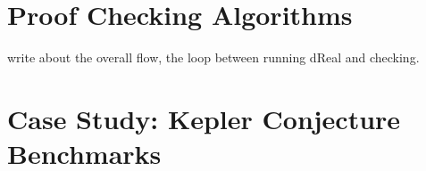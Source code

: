 \documentclass[envcountsect]{llncs}
\begin{document}
\section{Proof Checking Algorithms}

write about the overall flow, the loop between running dReal and checking. 

\section{Case Study: Kepler Conjecture Benchmarks}






\end{document}
